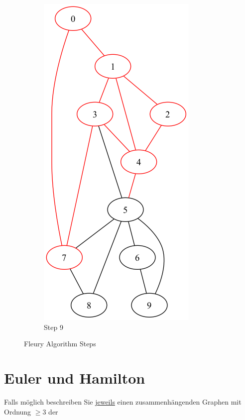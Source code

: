 \documentclass[a4paper,11pt]{report}
\begin{document}
\begin{figure}[htbp]
\begin{subfigure}[b]{0.3\textwidth}
        \includegraphics[height=0.29\textheight]{notebook/assets/aufgabe_07_fleury_step_8.png}
        \caption{Step 9}
        \label{fig:fleury_step_9}
    \end{subfigure}
    
    \caption{Fleury Algorithm Steps}
    \label{fig:fleury_algorithm_steps}
\end{figure}

\newpage

\chapter{Euler und Hamilton}
Falls möglich beschreiben Sie \underline{jeweils} einen zusammenhängenden Graphen mit Ordnung $\geq 3$ der
\end{document}
